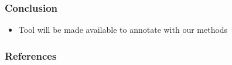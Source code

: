 \documentclass[table]{beamer}
\begin{document}
\begin{frame}
\begin{itemize}
\end{itemize}
\end{frame}

\begin{frame}
  \frametitle{Conclusion}
  \begin{itemize}
    \item Tool will be made available to annotate with our methods
  \end{itemize}
\end{frame}

\begin{frame}
  \frametitle{References}
  
  
\end{frame}
\end{document}
